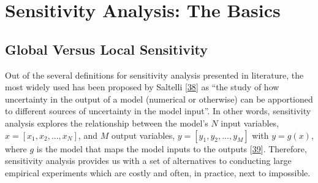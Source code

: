 \documentclass[letterpaper,10pt,english]{book}
\begin{document}
\begin{sphinxVerbatim}[commandchars=\\\{\}]
           \PYGZbs{}              \PYGZbs{} 
\end{sphinxVerbatim}


\chapter{Sensitivity Analysis: The Basics}
\label{\detokenize{3_sensitivity_analysis_the_basics:sensitivity-analysis-the-basics}}\label{\detokenize{3_sensitivity_analysis_the_basics:id1}}\label{\detokenize{3_sensitivity_analysis_the_basics::doc}}

\section{Global Versus Local Sensitivity}
\label{\detokenize{3_sensitivity_analysis_the_basics:global-versus-local-sensitivity}}\label{\detokenize{3_sensitivity_analysis_the_basics:global-vs-local}}
\sphinxAtStartPar
Out of the several definitions for sensitivity analysis presented in literature, the most widely used has been proposed by Saltelli  {[}\hyperlink{cite.index:id17}{38}{]} as “the study of how uncertainty in the output of a model (numerical or otherwise) can be apportioned to different sources of uncertainty in the model input”. In other words, sensitivity analysis explores the relationship between the model’s \(N\) input variables, \(x=[x_1,x_2,...,x_N]\), and \(M\) output variables, \(y=[y_1,y_2,...,y_M]\) with \(y=g(x)\), where \(g\) is the model that maps the model inputs to the outputs {[}\hyperlink{cite.index:id22}{39}{]}. Therefore, sensitivity analysis provides us with a set of alternatives to conducting large empirical experiments which are costly and often, in practice, next to impossible.
\end{document}

